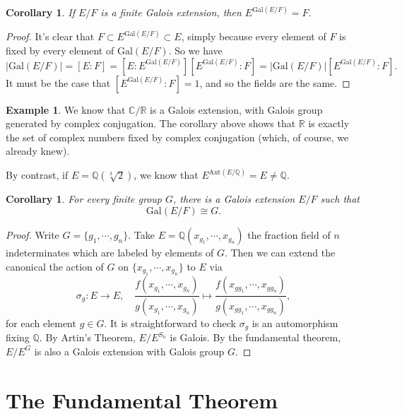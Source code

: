 \documentclass[12pt]{report}
\newtheorem{corollary}[theorem]{Corollary}
\theoremstyle{definition}
\newtheorem{example}[theorem]{Example}
\newcommand{\Aut}{\text{Aut}}
\newcommand{\Gal}{\text{Gal}}
\newcommand{\CC}{\mathbb{C}}
\newcommand{\QQ}{\mathbb{Q}}
\newcommand{\RR}{\mathbb{R}}
\begin{document}
\begin{corollary}\label{artincor}
	If $E/F$ is a finite Galois extension, then $E^{\Gal(E/F)} = F$.
\end{corollary}

\begin{proof}
	It's clear that $F \subset E^{\Gal(E/F)}\subset E$, simply because every element of $F$ is fixed by every element of $\Gal(E/F)$. So we have $$|\Gal(E/F)|=[E : F] = [E : E^{\Gal(E/F)}][E^{\Gal(E/F)} : F] =|\Gal(E/F)|[E^{\Gal(E/F)} : F].$$
	It must be the case that $[E^{\Gal(E/F)} : F] = 1$, and so the fields are the same.
\end{proof}

\begin{example}
	We know that $\CC/\RR$ is a Galois extension, with Galois group generated by complex conjugation. The corollary above shows that $\RR$ is exactly the set of complex numbers fixed by complex conjugation (which, of course, we already knew).

	By contrast, if $E =\QQ(\sqrt[3]{2})$, we know that $E^{\Aut(E/\QQ)} = E \not= \QQ$.
\end{example}


\begin{corollary}
	For every finite group $G$, there is a Galois extension $E/F$ such that $$\Gal(E/F) \cong G.$$
\end{corollary}

\begin{proof}
	Write $G=\{g_1,\cdots,g_n\}$. Take $E=\QQ(x_{g_1},\cdots,x_{g_n})$ the fraction field of $n$ indeterminates which are labeled by elements of $G$. Then we can extend the canonical the action of $G$ on $\{x_{g_1},\cdots,x_{g_n}\}$ to $E$ via $$\sigma_g: E\to E,\quad  \frac{f(x_{g_1},\cdots,x_{g_n})}{g(x_{g_1},\cdots,x_{g_n})}\mapsto  \frac{f(x_{gg_1},\cdots,x_{gg_n})}{g(x_{gg_1},\cdots,x_{gg_n})},$$ for each element $g\in G$. It is straightforward to check $\sigma_g$ is an automorphism fixing $\QQ$. By Artin's Theorem, $E/E^{S_n}$ is Galois. By the fundamental theorem, $E/E^G$ is also a Galois extension with Galois group $G$.
\end{proof}


\section{The Fundamental Theorem}
\end{document}
